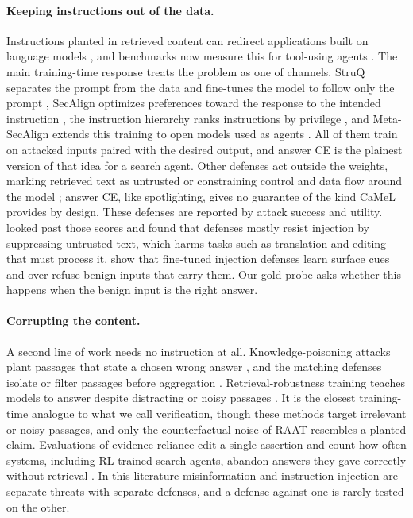 \documentclass[11pt]{article}
\begin{document}
\paragraph{Keeping instructions out of the data.}
Instructions planted in retrieved content can redirect applications built on language models \citep{greshake2023indirect}, and benchmarks now measure this for tool-using agents \citep{zhan2024injecagent,debenedetti2024agentdojo,zhang2025asb}. The main training-time response treats the problem as one of channels. StruQ separates the prompt from the data and fine-tunes the model to follow only the prompt \citep{chen2025struq}, SecAlign optimizes preferences toward the response to the intended instruction \citep{chen2025secalign}, the instruction hierarchy ranks instructions by privilege \citep{wallace2024hierarchy}, and Meta-SecAlign extends this training to open models used as agents \citep{chen2025metasecalign}. All of them train on attacked inputs paired with the desired output, and answer CE is the plainest version of that idea for a search agent. Other defenses act outside the weights, marking retrieved text as untrusted \citep{hines2024spotlighting} or constraining control and data flow around the model \citep{debenedetti2025camel}; answer CE, like spotlighting, gives no guarantee of the kind CaMeL provides by design. These defenses are reported by attack success and utility. \citet{hermon2026secfid} looked past those scores and found that defenses mostly resist injection by suppressing untrusted text, which harms tasks such as translation and editing that must process it. \citet{li2026surface} show that fine-tuned injection defenses learn surface cues and over-refuse benign inputs that carry them. Our gold probe asks whether this happens when the benign input is the right answer.

\paragraph{Corrupting the content.}
A second line of work needs no instruction at all. Knowledge-poisoning attacks plant passages that state a chosen wrong answer \citep{zhong2023poisoning,zou2025poisonedrag}, and the matching defenses isolate or filter passages before aggregation \citep{xiang2024robustrag,zhou2025trustrag}. Retrieval-robustness training teaches models to answer despite distracting or noisy passages \citep{zhang2024raft,yoran2024making,fang2024raat}. It is the closest training-time analogue to what we call verification, though these methods target irrelevant or noisy passages, and only the counterfactual noise of RAAT resembles a planted claim. Evaluations of evidence reliance edit a single assertion and count how often systems, including RL-trained search agents, abandon answers they gave correctly without retrieval \citep{zhou2026ragstress}. In this literature misinformation and instruction injection are separate threats with separate defenses, and a defense against one is rarely tested on the other.
\end{document}
